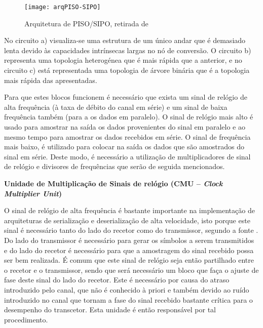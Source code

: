 	\begin{figure}[h!]
		\begin{center}
			\leavevmode
			\texttt{[image: arqPISO-SIPO]}
			\caption{Arquitetura de PISO/SIPO, retirada de \cite{R012}}
			\label{fig:PISO-SIPO}
		\end{center}
	\end{figure}
	
	\hspace{1.0em}No circuito a) visualiza-se uma estrutura de um único andar que é demasiado lenta devido às capacidades intrínsecas largas no nó de conversão. O circuito b) representa uma topologia heterogénea que é mais rápida que a anterior, e no circuito c) está representada uma topologia de árvore binária que é a topologia mais rápida das apresentadas. 
	
	\hspace{1.0em}Para que estes blocos funcionem é necessário que exista um sinal de relógio de alta frequência (à taxa de débito do canal em série) e um sinal de baixa frequência também (para a os dados em paralelo). O sinal de relógio mais alto é usado para amostrar na saída os dados provenientes do sinal em paralelo e ao mesmo tempo para amostrar os dados recebidos em série. O sinal de frequência mais baixo, é utilizado para colocar na saída os dados que são amostrados do sinal em série. Deste modo, é necessário a utilização de multiplicadores de sinal de relógio e divisores de frequências que serão de seguida mencionados.
	
 \textbf{Unidade de Multiplicação de Sinais de relógio (CMU – \textit{Clock Multiplier Unit})}
	
	\hspace{1.0em}O sinal de relógio de alta frequência é bastante importante na implementação de arquiteturas de serialização e deserialização de alta velocidade, isto porque este sinal é necessário tanto do lado do recetor como do transmissor, segundo a fonte \cite{R012}. Do lado do transmissor é necessário para gerar os símbolos a serem transmitidos e do lado do recetor é necessário para que a amostragem do sinal recebido possa ser bem realizada. É comum que este sinal de relógio seja então partilhado entre o recetor e o transmissor, sendo que será necessário um bloco que faça o ajuste de fase deste sinal do lado do recetor. Este é necessário por causa do atraso introduzido pelo canal, que não é conhecido à priori e também devido ao ruído introduzido no canal que tornam a fase do sinal recebido bastante crítica para o desempenho do transcetor. Esta unidade é então responsável por tal procedimento.
	
